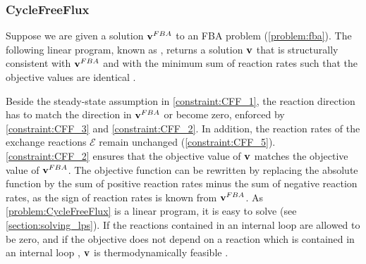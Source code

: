 \subsubsection{CycleFreeFlux} \label{section:molecular_networks_cyclefreeflux}
Suppose we are given a solution $\bold v^{FBA}$ to an \textsf{FBA} problem (\cref{problem:fba}). 
The following linear program, known as , returns a solution $\bold v$ that is structurally consistent with $\bold v^{FBA}$ and with the minimum sum of reaction rates such that the objective values are identical \cite{desouki_cyclefreeflux_2015-1}. 

Beside the steady-state assumption in \cref{constraint:CFF_1}, the reaction direction has to match the direction in $\bold v^{FBA}$ or become zero, enforced by \cref{constraint:CFF_3} and \cref{constraint:CFF_2}. In addition, the reaction rates of the exchange reactions $\mathcal{E}$ remain unchanged (\cref{constraint:CFF_5}).
\cref{constraint:CFF_2} ensures that the objective value of $\bold v$ matches the objective value of $\bold v^{FBA}$. The objective function can be rewritten by replacing the absolute function by the sum of positive reaction rates minus the sum of negative reaction rates, as the sign of reaction rates is known from $\bold v^{FBA}$. As \cref{problem:CycleFreeFlux} is a linear program, it is easy to solve (see \cref{section:solving_lps}). 
If the reactions contained in an internal loop are allowed to be zero, and  if the objective does not depend on a reaction which is contained in an internal loop%
, $\bold v$ is thermodynamically feasible \cite{noor_removing_2018}. 

